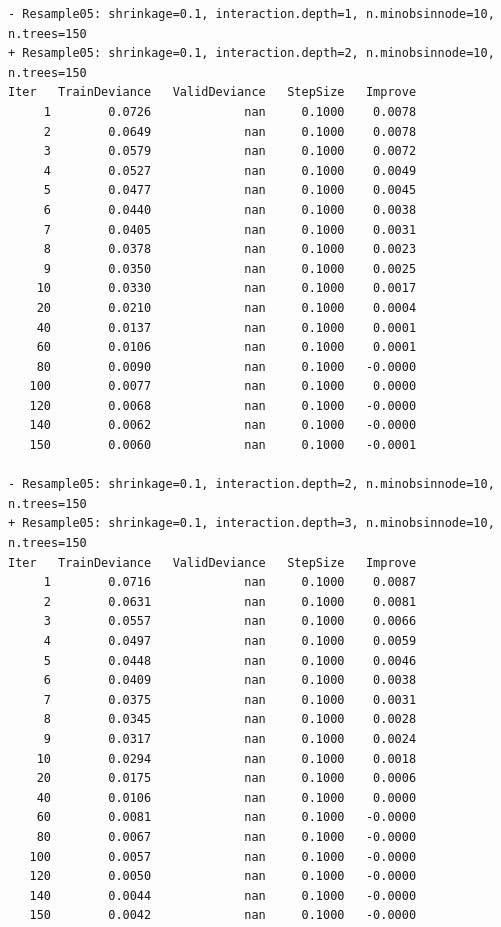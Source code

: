 \documentclass[
  letterpaper,
  DIV=11,
  numbers=noendperiod]{scrartcl}
\begin{document}
\begin{verbatim}
- Resample05: shrinkage=0.1, interaction.depth=1, n.minobsinnode=10, n.trees=150 
+ Resample05: shrinkage=0.1, interaction.depth=2, n.minobsinnode=10, n.trees=150 
Iter   TrainDeviance   ValidDeviance   StepSize   Improve
     1        0.0726             nan     0.1000    0.0078
     2        0.0649             nan     0.1000    0.0078
     3        0.0579             nan     0.1000    0.0072
     4        0.0527             nan     0.1000    0.0049
     5        0.0477             nan     0.1000    0.0045
     6        0.0440             nan     0.1000    0.0038
     7        0.0405             nan     0.1000    0.0031
     8        0.0378             nan     0.1000    0.0023
     9        0.0350             nan     0.1000    0.0025
    10        0.0330             nan     0.1000    0.0017
    20        0.0210             nan     0.1000    0.0004
    40        0.0137             nan     0.1000    0.0001
    60        0.0106             nan     0.1000    0.0001
    80        0.0090             nan     0.1000   -0.0000
   100        0.0077             nan     0.1000    0.0000
   120        0.0068             nan     0.1000   -0.0000
   140        0.0062             nan     0.1000   -0.0000
   150        0.0060             nan     0.1000   -0.0001

- Resample05: shrinkage=0.1, interaction.depth=2, n.minobsinnode=10, n.trees=150 
+ Resample05: shrinkage=0.1, interaction.depth=3, n.minobsinnode=10, n.trees=150 
Iter   TrainDeviance   ValidDeviance   StepSize   Improve
     1        0.0716             nan     0.1000    0.0087
     2        0.0631             nan     0.1000    0.0081
     3        0.0557             nan     0.1000    0.0066
     4        0.0497             nan     0.1000    0.0059
     5        0.0448             nan     0.1000    0.0046
     6        0.0409             nan     0.1000    0.0038
     7        0.0375             nan     0.1000    0.0031
     8        0.0345             nan     0.1000    0.0028
     9        0.0317             nan     0.1000    0.0024
    10        0.0294             nan     0.1000    0.0018
    20        0.0175             nan     0.1000    0.0006
    40        0.0106             nan     0.1000    0.0000
    60        0.0081             nan     0.1000   -0.0000
    80        0.0067             nan     0.1000   -0.0000
   100        0.0057             nan     0.1000   -0.0000
   120        0.0050             nan     0.1000   -0.0000
   140        0.0044             nan     0.1000   -0.0000
   150        0.0042             nan     0.1000   -0.0000


\end{verbatim}
\end{document}
